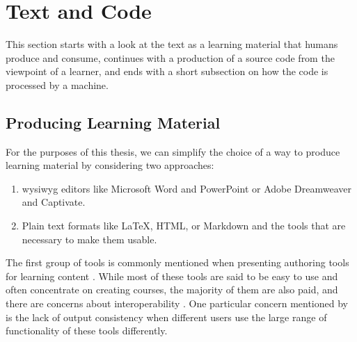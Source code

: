 \section{Text and Code}
\label{sec:text-code}

This section starts with a look at the text as a learning material that humans produce and consume, continues with a production of a source code from the viewpoint of a learner, and ends with a short subsection on how the code is processed by a machine.

\subsection{Producing Learning Material}

For the purposes of this thesis, we can simplify the choice of a way to produce learning material by considering two approaches:

\begin{enumerate}
    \item \gls{wysiwyg} editors like Microsoft Word and PowerPoint or Adobe Dreamweaver and Captivate.
    \item Plain text formats like \LaTeX, HTML, or Markdown and the tools that are necessary to make them usable.
\end{enumerate}

The first group of tools is commonly mentioned when presenting authoring tools for learning content \parencite{khademi_review_nodate}.
While most of these tools are said to be easy to use and often concentrate on creating courses, the majority of them are also paid, and there are concerns about interoperability \parencites{khademi_review_nodate}{shieber_why_2014}.
One particular concern mentioned by \textcite{shieber_why_2014} is the lack of output consistency when different users use the large range of functionality of these tools differently.

